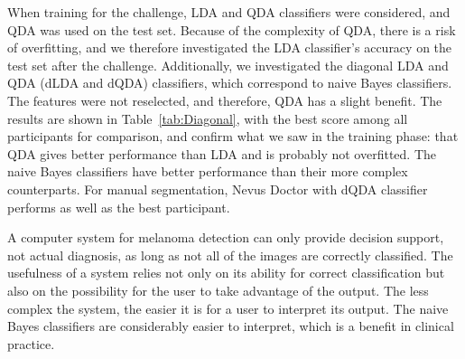 \documentclass[a4paper,12pt]{article}
\begin{document}
When training for the challenge, LDA and QDA classifiers were considered, and QDA was used on the test set. Because of the complexity of QDA, there is a risk of overfitting, and we therefore investigated the LDA classifier's accuracy on the test set after the challenge. Additionally, we investigated the diagonal LDA and QDA (dLDA and dQDA) classifiers, which correspond to naive Bayes classifiers. The features were not reselected, and therefore, QDA has a slight benefit. The results are shown in Table~\ref{tab:Diagonal}, with the best score among all participants for comparison,  and confirm what we saw in the training phase: that QDA gives better performance than LDA and is probably not overfitted. The naive Bayes classifiers have better performance than their more complex counterparts. For manual segmentation, Nevus Doctor with dQDA classifier performs as well as the best participant. 
 
A computer system for melanoma detection can only provide decision support, not actual diagnosis, as long as not all of the images are correctly classified. The usefulness of a system relies not only on its ability for correct classification but also on the possibility for the user to take advantage of the output. The less complex the system, the easier it is for a user to interpret its output. The naive Bayes classifiers are considerably easier to interpret, which is a benefit in clinical practice.


\end{document}
